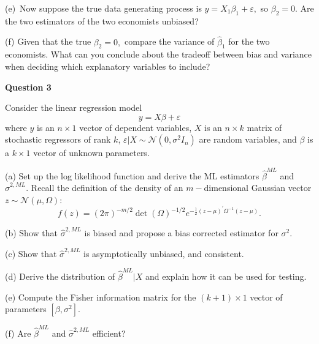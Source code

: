 \documentclass{article}
\begin{document}
(e)\ Now suppose the true data generating process is $y=X_{1}\beta
_{1}+\varepsilon ,$ so $\beta _{2}=0.$ Are the two estimators of the two
economists unbiased?

(f) Given that the true $\beta _{2}=0,$ compare the variance of $\hat{\beta}%
_{1}$ for the two economists. What can you conclude about the tradeoff
between bias and variance when deciding which explanatory variables to
include?

\bigskip 

\textbf{Question 3 }

Consider the linear regression model 
\begin{equation*}
y=X\beta +\varepsilon 
\end{equation*}%
where $y$ is an $n\times 1$ vector of dependent variables, $X$ is an $%
n\times k$ matrix of stochastic regressors of rank $k$, $\varepsilon |X\sim 
\mathcal{N}(0,\sigma ^{2}I_{n})$ are random variables, and $\beta $ is a $%
k\times 1$ vector of unknown parameters$.$

(a) Set up the log likelihood function and derive the ML estimators $%
\widehat{\beta }^{ML}$ and $\widehat{\sigma }^{2,ML}.$ Recall the definition
of the density of an $m-$dimensional Gaussian vector $z\sim \mathcal{N}(\mu
,\Omega ):$ 
\begin{equation*}
f\left( z\right) =\left( 2\pi \right) ^{-m/2}\det \left( \Omega \right)
^{-1/2}e^{-\frac{1}{2}\left( z-\mu \right) ^{\prime }\Omega ^{-1}\left(
z-\mu \right) }.
\end{equation*}

(b) Show that $\widehat{\sigma }^{2,ML}$ is biased and propose a bias
corrected estimator for $\sigma ^{2}.$

(c) Show that $\widehat{\sigma }^{2,ML}$ is asymptotically unbiased, and
consistent.

(d) Derive the distribution of $\widehat{\beta }^{ML}|X$ and explain how it
can be used for testing. 

(e) Compute the Fisher information matrix for the $(k+1)\times 1$ vector of
parameters $[\beta ,\sigma ^{2}].$

(f) Are $\widehat{\beta }^{ML}$ and $\widehat{\sigma }^{2,ML}$ efficient?
\end{document}
